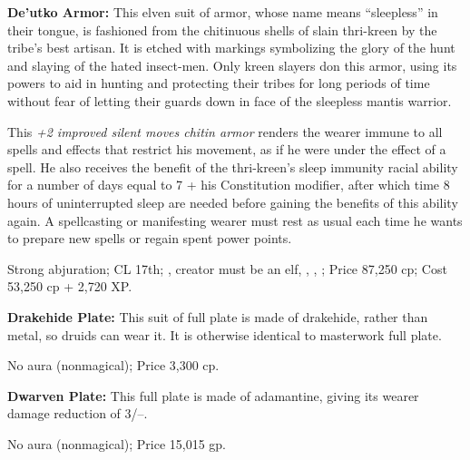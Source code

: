 \textbf{De'utko Armor:} This elven suit of armor, whose name means ``sleepless'' in their tongue, is fashioned from the chitinuous shells of slain thri-kreen by the tribe's best artisan. It is etched with markings symbolizing the glory of the hunt and slaying of the hated insect-men. Only kreen slayers don this armor, using its powers to aid in hunting and protecting their tribes for long periods of time without fear of letting their guards down in face of the sleepless mantis warrior.

This \emph{+2 improved silent moves chitin armor} renders the wearer immune to all spells and effects that restrict his movement, as if he were under the effect of a  spell. He also receives the benefit of the thri-kreen's sleep immunity racial ability for a number of days equal to 7 + his Constitution modifier, after which time 8 hours of uninterrupted sleep are needed before gaining the benefits of this ability again. A spellcasting or manifesting wearer must rest as usual each time he wants to prepare new spells or regain spent power points.

Strong abjuration; CL 17th; , creator must be an elf, , , ; Price 87,250 cp; Cost 53,250 cp + 2,720 XP.

\textbf{Drakehide Plate:} This suit of full plate is made of drakehide, rather than metal, so druids can wear it. It is otherwise identical to masterwork full plate.

No aura (nonmagical); Price 3,300 cp.

\textbf{Dwarven Plate:} This full plate is made of adamantine, giving its wearer damage reduction of 3/--.

No aura (nonmagical); Price 15,015 gp.

